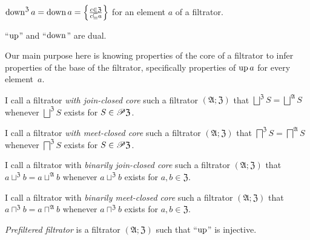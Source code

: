 \begin{defn}
$\operatorname{down}^{\mathfrak{Z}}a=\operatorname{down} a=\left\{ \frac{c\in\mathfrak{Z}}{c\sqsubseteq a}\right\}$
for an element $a$ of a filtrator.\end{defn}
\begin{obvious}
``$\operatorname{up}$'' and ``$\operatorname{down}$'' are dual.
\end{obvious}
Our main purpose here is knowing properties of the core of a filtrator
to infer properties of the base of the filtrator, specifically properties
of $\operatorname{up} a$ for every element~$a$.
\begin{defn}
I call a filtrator \emph{with
join-closed core} such a filtrator $(\mathfrak{A};\mathfrak{Z})$
that $\bigsqcup^{\mathfrak{Z}}S=\bigsqcup^{\mathfrak{A}}S$ whenever
$\bigsqcup^{\mathfrak{Z}}S$ exists for $S\in\mathscr{P}\mathfrak{Z}$.
\end{defn}

\begin{defn}
I call a filtrator \emph{with
meet-closed core} such a filtrator $(\mathfrak{A};\mathfrak{Z})$
that $\bigsqcap^{\mathfrak{Z}}S=\bigsqcap^{\mathfrak{A}}S$ whenever
$\bigsqcap^{\mathfrak{Z}}S$ exists for $S\in\mathscr{P}\mathfrak{Z}$.
\end{defn}

\begin{defn}
I call a filtrator
with \emph{binarily join-closed core} such a filtrator $(\mathfrak{A};\mathfrak{Z})$
that $a\sqcup^{\mathfrak{Z}}b=a\sqcup^{\mathfrak{A}}b$ whenever $a\sqcup^{\mathfrak{Z}}b$
exists for $a,b\in\mathfrak{Z}$.
\end{defn}

\begin{defn}
I call a filtrator
with \emph{binarily meet-closed core} such a filtrator $(\mathfrak{A};\mathfrak{Z})$
that $a\sqcap^{\mathfrak{Z}}b=a\sqcap^{\mathfrak{A}}b$ whenever
$a\sqcap^{\mathfrak{Z}}b$ exists for $a,b\in\mathfrak{Z}$.
\end{defn}

\begin{defn}
\emph{Prefiltered filtrator} is a filtrator
$(\mathfrak{A};\mathfrak{Z})$ such that ``$\operatorname{up}$'' is injective.
\end{defn}

